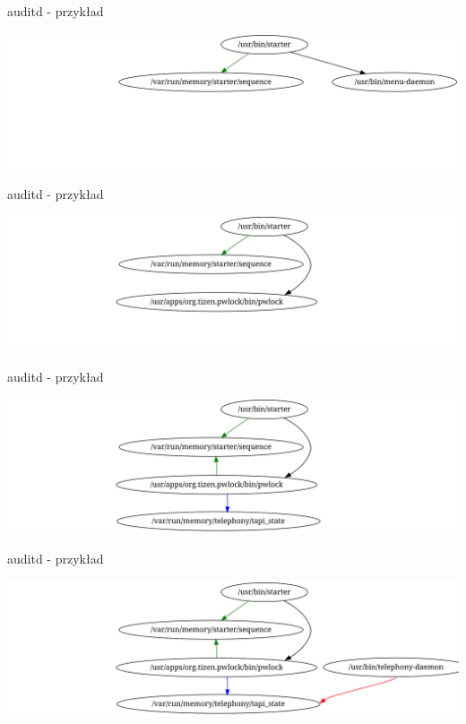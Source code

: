 \documentclass[presentation,aspectratio=43,12pt]{beamer}
\begin{document}
\begin{frame}[label=sec-4-8]{auditd - przykład}
\begin{center}
\includegraphics[width=\textwidth]{images/auditd-2}
\end{center}
\end{frame}
\begin{frame}[label=sec-4-9]{auditd - przykład}
\begin{center}
\includegraphics[width=\textwidth]{images/auditd-3}
\end{center}
\end{frame}

\begin{frame}[label=sec-4-10]{auditd - przykład}
\begin{center}
\includegraphics[width=\textwidth]{images/auditd-4}
\end{center}
\end{frame}

\begin{frame}[label=sec-4-11]{auditd - przykład}
\begin{center}
\includegraphics[width=\textwidth]{images/auditd-5}
\end{center}
\end{frame}
\end{document}
